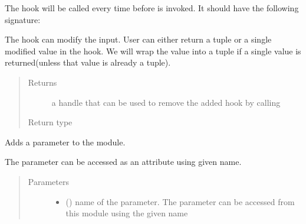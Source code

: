\documentclass[letterpaper,10pt,english]{sphinxmanual}
\begin{document}
\begin{fulllineitems}
\begin{fulllineitems}
The hook will be called every time before {\hyperref[\detokenize{api/autoencoding:geology.metamodelling.SpatialAutoencoder.forward}]{}} is invoked.
It should have the following signature:

\begin{sphinxVerbatim}[commandchars=\\\{\}]
      
\end{sphinxVerbatim}

The hook can modify the input. User can either return a tuple or a
single modified value in the hook. We will wrap the value into a tuple
if a single value is returned(unless that value is already a tuple).
\begin{quote}\begin{description}
\item[{Returns}] \leavevmode
a handle that can be used to remove the added hook by calling

\item[{Return type}] \leavevmode
{}

\end{description}\end{quote}

\end{fulllineitems}


\begin{fulllineitems}
\label{\detokenize{api/autoencoding:geology.metamodelling.SpatialAutoencoder.register_parameter}}
Adds a parameter to the module.

The parameter can be accessed as an attribute using given name.
\begin{quote}\begin{description}
\item[{Parameters}] \leavevmode\begin{itemize}
\item {} 
 () \textendash{} name of the parameter. The parameter can be accessed
from this module using the given name


\end{itemize}
\end{description}
\end{quote}
\end{fulllineitems}
\end{fulllineitems}
\end{document}
